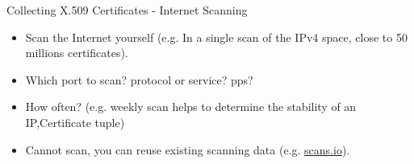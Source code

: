 \begin{frame}[t,fragile]{Collecting X.509 Certificates - Internet Scanning}
        \begin{itemize}
                \item Scan the Internet yourself (e.g. In a single scan of the IPv4 space, close to 50 millions certificates).
                \item Which port to scan? protocol or service? pps?
                \item How often? (e.g. weekly scan helps to determine the stability of an IP,Certificate tuple)
                \item Cannot scan, you can reuse existing scanning data (e.g. \url{scans.io}).
        \end{itemize}
\end{frame}

\usetikzlibrary{positioning}

